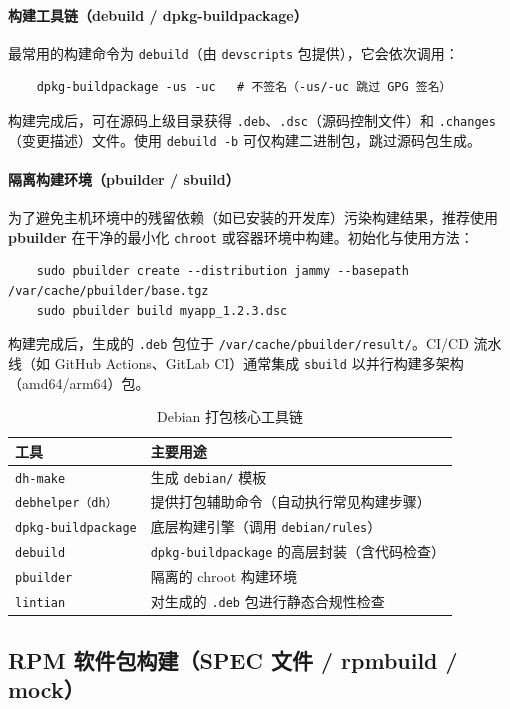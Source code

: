 \documentclass[12pt,UTF8]{ctexbook}
\begin{document}
\paragraph{构建工具链（debuild / dpkg-buildpackage）}
最常用的构建命令为 \texttt{debuild}（由 \texttt{devscripts} 包提供），它会依次调用：
\begin{verbatim}
	dpkg-buildpackage -us -uc   # 不签名（-us/-uc 跳过 GPG 签名）
\end{verbatim}
构建完成后，可在源码上级目录获得 \texttt{.deb}、\texttt{.dsc}（源码控制文件）和 \texttt{.changes}（变更描述）文件。使用 \verb|debuild -b| 可仅构建二进制包，跳过源码包生成。

\paragraph{隔离构建环境（pbuilder / sbuild）}
为了避免主机环境中的残留依赖（如已安装的开发库）污染构建结果，推荐使用 \textbf{pbuilder} 在干净的最小化 \texttt{chroot} 或容器环境中构建。初始化与使用方法：
\begin{verbatim}
	sudo pbuilder create --distribution jammy --basepath /var/cache/pbuilder/base.tgz
	sudo pbuilder build myapp_1.2.3.dsc
\end{verbatim}
构建完成后，生成的 \texttt{.deb} 包位于 \texttt{/var/cache/pbuilder/result/}。CI/CD 流水线（如 GitHub Actions、GitLab CI）通常集成 \texttt{sbuild} 以并行构建多架构（amd64/arm64）包。

\begin{table}[htbp]
	\centering
	\caption{Debian 打包核心工具链}
	\begin{tabular}{@{}ll@{}}
		\toprule
		\textbf{工具} & \textbf{主要用途} \\
		\midrule
		\texttt{dh-make} & 生成 \texttt{debian/} 模板 \\
		\texttt{debhelper（dh）} & 提供打包辅助命令（自动执行常见构建步骤） \\
		\texttt{dpkg-buildpackage} & 底层构建引擎（调用 \texttt{debian/rules}） \\
		\texttt{debuild} & \texttt{dpkg-buildpackage} 的高层封装（含代码检查） \\
		\texttt{pbuilder} & 隔离的 chroot 构建环境 \\
		\texttt{lintian} & 对生成的 \texttt{.deb} 包进行静态合规性检查 \\
		\bottomrule
	\end{tabular}
\end{table}

\subsection{RPM 软件包构建（SPEC 文件 / rpmbuild / mock）}
\end{document}
